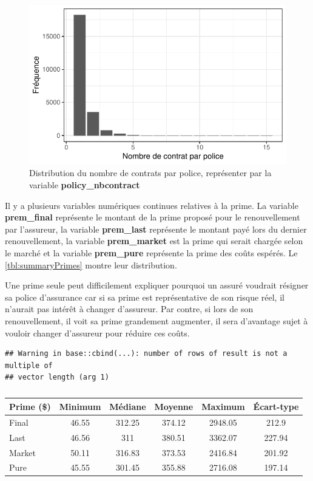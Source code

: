 \documentclass[
]{article}
\begin{document}
\begin{figure}

{\centering \includegraphics{01-Rapport_files/figure-latex/graph_policy_nbcontract-1} 

}

\caption{\label{fig:policyNbcontract}Distribution du nombre de contrats par police, représenter par la variable \textbf{policy\_nbcontract}}\label{fig:graph_policy_nbcontract}
\end{figure}

Il y a plusieurs variables numériques continues relatives à la prime. La
variable \textbf{prem\_final} représente le montant de la prime proposé
pour le renouvellement par l'assureur, la variable \textbf{prem\_last}
représente le montant payé lors du dernier renouvellement, la variable
\textbf{prem\_market} est la prime qui serait chargée selon le marché et
la variable \textbf{prem\_pure} représente la prime des coûts espérés.
Le \autoref{tbl:summaryPrimes} montre leur distribution.

Une prime seule peut difficilement expliquer pourquoi un assuré voudrait
résigner sa police d'assurance car si sa prime est représentative de son
risque réel, il n'aurait pas intérêt à changer d'assureur. Par contre,
si lors de son renouvellement, il voit sa prime grandement augmenter, il
sera d'avantage sujet à vouloir changer d'assureur pour réduire ces
coûts.

\begin{verbatim}
## Warning in base::cbind(...): number of rows of result is not a multiple of
## vector length (arg 1)
\end{verbatim}

\begin{table}[ht]
\centering
\caption{} 
\label{}
\begin{tabular}{lccccc}
  \hline
Prime (\$) & Minimum & Médiane & Moyenne & Maximum & Écart-type \\ 
  \hline
Final & 46.55 & 312.25 & 374.12 & 2948.05 & 212.9 \\ 
  Last & 46.56 & 311 & 380.51 & 3362.07 & 227.94 \\ 
  Market & 50.11 & 316.83 & 373.53 & 2416.84 & 201.92 \\ 
  Pure & 45.55 & 301.45 & 355.88 & 2716.08 & 197.14 \\ 
   \hline
\hline
\end{tabular}
\end{table}
\end{document}

